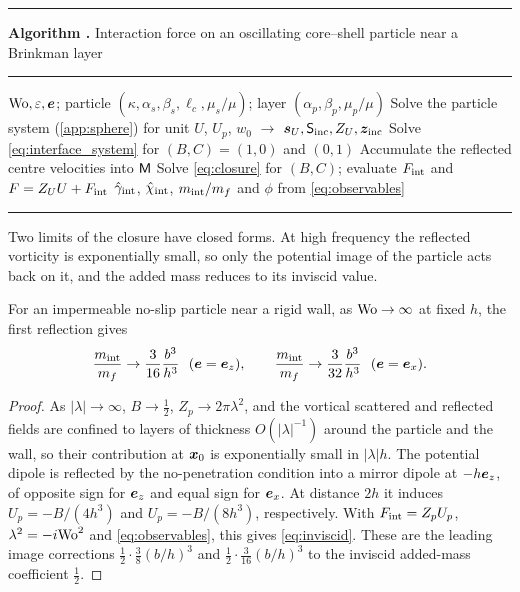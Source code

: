 \begin{center}\begin{minipage}{\linewidth}\small
\hrule\smallskip
{}\label{alg:force}%
\noindent\textbf{Algorithm \thealgorithm.} Interaction force on an oscillating core--shell particle near a Brinkman layer
\smallskip\hrule\smallskip
\begin{algorithmic}[1]
\Require $\mathrm{Wo},\varepsilon,\bm{e}$; particle $(\kappa,\alpha_s,\beta_s,\hat\ell_c,\mu_s/\mu)$; layer $(\alpha_p,\beta_p,\mu_p/\mu)$
\State Solve the particle system (\cref{app:sphere}) for unit $U$, $U_p$, $w_0$ $\to$ $\bm s_U,\mathsf S_{\rm inc},Z_U,\bm z_{\rm inc}$
 
  \State Solve \cref{eq:interface_system} for $(B,C)=(1,0)$ and $(0,1)$
  \State Accumulate the reflected centre velocities into $\mathsf{M}$
\EndFor
\State Solve \cref{eq:closure} for $(B,C)$; evaluate $F_{\rm int}$ and $F=Z_UU+F_{\rm int}$
\State \Return $\hat\gamma_{\rm int}$, $\hat\chi_{\rm int}$, $m_{\rm int}/m_f$ and $\phi$ from \cref{eq:observables}
\end{algorithmic}
\smallskip\hrule
\end{minipage}\end{center}

Two limits of the closure have closed forms. At high frequency the reflected vorticity is exponentially small, so only
the potential image of the particle acts back on it, and the added mass reduces to its inviscid value.

\begin{proposition}\label{prop:inviscid}
For an impermeable no-slip particle near a rigid wall, as $\mathrm{Wo}\to\infty$ at fixed $h$, the first reflection gives
\begin{equation}
  \frac{m_{\rm int}}{m_f}\to\frac{3}{16}\frac{b^3}{h^3}\ \ (\bm{e}=\bm{e}_z),\qquad
  \frac{m_{\rm int}}{m_f}\to\frac{3}{32}\frac{b^3}{h^3}\ \ (\bm{e}=\bm{e}_x).
  \label{eq:inviscid}
\end{equation}
\end{proposition}
\begin{proof}
As $|\lambda|\to\infty$, $B\to\tfrac12$, $Z_p\to2\pi\lambda^2$, and the vortical scattered and reflected fields are
confined to layers of thickness $O(|\lambda|^{-1})$ around the particle and the wall, so their contribution at
$\bm{x}_0$ is exponentially small in $|\lambda|h$. The potential dipole is reflected by the no-penetration condition into a
mirror dipole at $-h\bm{e}_z$, of opposite sign for $\bm{e}_z$ and equal sign for $\bm{e}_x$. At distance $2h$ it induces
$U_p=-B/(4h^3)$ and $U_p=-B/(8h^3)$, respectively. With $F_{\rm int}=Z_pU_p$, $\lambda^2=-i\mathrm{Wo}^2$ and
\cref{eq:observables}, this gives \cref{eq:inviscid}. These are the leading image corrections
$\tfrac12\cdot\tfrac38(b/h)^3$ and $\tfrac12\cdot\tfrac3{16}(b/h)^3$ to the inviscid added-mass coefficient
$\tfrac12$.
\end{proof}


